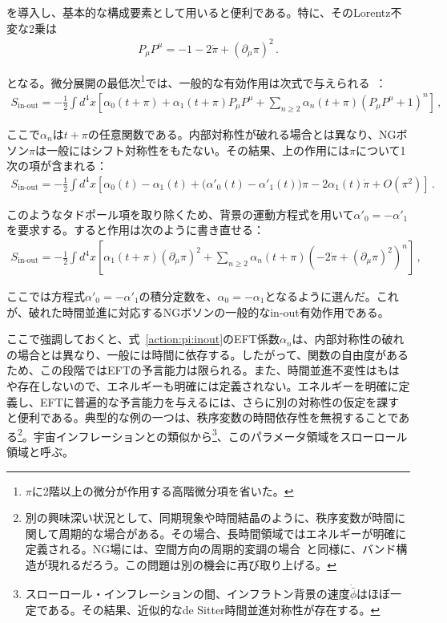 を導入し、基本的な構成要素として用いると便利である。特に、そのLorentz不変な2乗は
\begin{align}
 P_\mu P^\mu=-1-2\dot{\pi}+(\partial_\mu\pi)^2\,.
\end{align}

となる。微分展開の最低次\footnote{$\pi$に2階以上の微分が作用する高階微分項を省いた。}では、一般的な有効作用は次式で与えられる~\cite{Cheung:2007st}：
\begin{align}
\label{S_in-out_P}
 S_{\text{in-out}} 
 = -\frac{1}{2}\int d^4x 
 \left[ \alpha_0(t+\pi) + \alpha_1(t+\pi) P_\mu P^\mu 
 + \sum_{n\geq2}\alpha_n(t+\pi)(P_\mu P^\mu+1)^n 
\right]\,,
\end{align}

ここで$\alpha_n$は$t+\pi$の任意関数である。内部対称性が破れる場合とは異なり、NGボソン$\pi$は一般にはシフト対称性をもたない。その結果、上の作用には$\pi$について1次の項が含まれる：
\begin{align}
 S_{\text{in-out}} 
 = -\frac{1}{2}\int d^4x 
 \left[ \alpha_0(t) - \alpha_1(t)
 + \Big(\alpha'_0(t)-\alpha'_1(t)\Big)\pi-2\alpha_1(t)\dot{\pi} + O (\pi^2)
\right]\,.
\end{align}

このようなタドポール項を取り除くため、背景の運動方程式を用いて$\alpha'_0=-\alpha'_1$を要求する。すると作用は次のように書き直せる：
\begin{align}
S_{\text{in-out}}=-\frac{1}{2}\int d^4x\left[\alpha_1(t+\pi)(\partial_\mu\pi)^2+\sum_{n\geq2}\alpha_n(t+\pi)\left(-2\dot{\pi}+(\partial_\mu\pi)^2\right)^n
\right]\,,\label{action:pi:inout}
\end{align}

ここでは方程式$\alpha'_0=-\alpha'_1$の積分定数を、$\alpha_0=-\alpha_1$となるように選んだ。これが、破れた時間並進に対応するNGボソンの一般的なin-out有効作用である。

\medskip
ここで強調しておくと、式~\eqref{action:pi:inout}のEFT係数$\alpha_n$は、内部対称性の破れの場合とは異なり、一般には時間に依存する。したがって、関数の自由度があるため、この段階ではEFTの予言能力は限られる。また、時間並進不変性はもはや存在しないので、エネルギーも明確には定義されない。エネルギーを明確に定義し、EFTに普遍的な予言能力を与えるには、さらに別の対称性の仮定を課すと便利である。典型的な例の一つは、秩序変数の時間依存性を無視することである\footnote{別の興味深い状況として、同期現象や時間結晶のように、秩序変数が時間に関して周期的な場合がある。その場合、長時間領域ではエネルギーが明確に定義される。NG場には、空間方向の周期的変調の場合~\cite{Hidaka:2015xza}と同様に、バンド構造が現れるだろう。この問題は別の機会に再び取り上げる。}。宇宙インフレーションとの類似から\footnote{スローロール・インフレーションの間、インフラトン背景の速度$\dot{\bar{\phi}}$はほぼ一定である。その結果、近似的なde Sitter時間並進対称性が存在する。}、このパラメータ領域をスローロール領域と呼ぶ。

